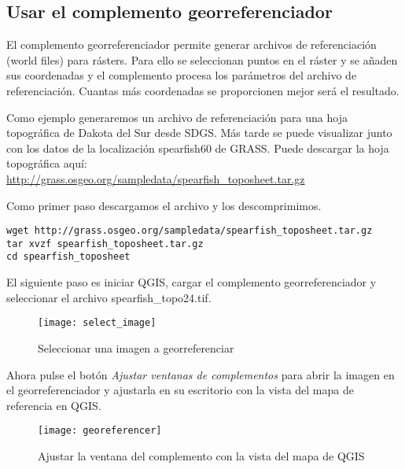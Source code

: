 \subsection{Usar el complemento georreferenciador}

El complemento georreferenciador permite generar archivos de referenciación (world files) para rásters. Para ello
se seleccionan puntos en el ráster y se añaden sus coordenadas y el complemento procesa los parámetros del archivo 
de referenciación. Cuantas más coordenadas se proporcionen mejor será el resultado.

Como ejemplo generaremos un archivo de referenciación para una hoja topográfica de Dakota del Sur 
desde SDGS. Más tarde se puede visualizar junto con los datos de la localización  
spearfish60 de GRASS. Puede descargar la hoja topográfica aquí: \\
\url{http://grass.osgeo.org/sampledata/spearfish\_toposheet.tar.gz}

Como primer paso descargamos el archivo y los descomprimimos.

\begin{verbatim}
wget http://grass.osgeo.org/sampledata/spearfish_toposheet.tar.gz
tar xvzf spearfish_toposheet.tar.gz
cd spearfish_toposheet
\end{verbatim}

El siguiente paso es iniciar QGIS, cargar el complemento georreferenciador y seleccionar el archivo spearfish\_topo24.tif.

\begin{figure}[ht]
\begin{center}
  \caption{Seleccionar una imagen a georreferenciar}\label{fig:select_image}\smallskip
  \texttt{[image: select\_image]}
\end{center}
\end{figure}

Ahora pulse el botón \textsl{Ajustar ventanas de complementos} para abrir la imagen 
en el georreferenciador y ajustarla en su escritorio con la vista del mapa de referencia en QGIS.

\begin{figure}[ht]
\begin{center}
  \caption{Ajustar la ventana del complemento con la vista del mapa de QGIS}\label{fig:georeferencer}\smallskip
  \texttt{[image: georeferencer]}
\end{center}
\end{figure}

